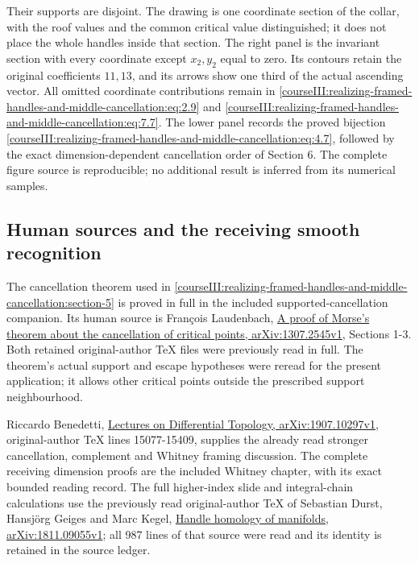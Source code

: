 Their supports are disjoint. The drawing is one coordinate section of the collar, with the roof values and the common critical value distinguished; it does not place the whole handles inside that section. The right panel is the invariant section with every coordinate except \(x_2,y_2\) equal to zero. Its contours retain the original coefficients \(11,13\), and its arrows show one third of the actual ascending vector. All omitted coordinate contributions remain in \eqref{courseIII:realizing-framed-handles-and-middle-cancellation:eq:2.9} and \eqref{courseIII:realizing-framed-handles-and-middle-cancellation:eq:7.7}. The lower panel records the proved bijection \eqref{courseIII:realizing-framed-handles-and-middle-cancellation:eq:4.7}, followed by the exact dimension-dependent cancellation order of Section 6. The complete figure source is reproducible; no additional result is inferred from its numerical samples.

\subsection{Human sources and the receiving smooth recognition}
\label{courseIII:realizing-framed-handles-and-middle-cancellation:middle-realization-sources}

\label{courseIII:realizing-framed-handles-and-middle-cancellation:section-8}

The cancellation theorem used in \cref{courseIII:realizing-framed-handles-and-middle-cancellation:section-5} is proved in full in the included supported-cancellation companion. Its human source is François Laudenbach, \href{https://arxiv.org/abs/1307.2545v1}{A proof of Morse's theorem about the cancellation of critical points, arXiv:1307.2545v1}, Sections 1-3. Both retained original-author TeX files were previously read in full. The theorem's actual support and escape hypotheses were reread for the present application; it allows other critical points outside the prescribed support neighbourhood.

Riccardo Benedetti, \href{https://arxiv.org/abs/1907.10297v1}{Lectures on Differential Topology, arXiv:1907.10297v1}, original-author TeX lines 15077-15409, supplies the already read stronger cancellation, complement and Whitney framing discussion. The complete receiving dimension proofs are the included Whitney chapter, with its exact bounded reading record. The full higher-index slide and integral-chain calculations use the previously read original-author TeX of Sebastian Durst, Hansjörg Geiges and Marc Kegel, \href{https://arxiv.org/abs/1811.09055v1}{Handle homology of manifolds, arXiv:1811.09055v1}; all 987 lines of that source were read and its identity is retained in the source ledger.

